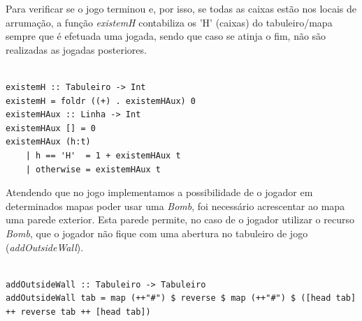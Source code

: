 \documentclass[12pt,a4paper]{report}
\begin{document}
\hfill

\hfill

Para verificar se o jogo terminou e, por isso, se todas as caixas estão nos locais de arrumação, a função \emph{existemH} contabiliza os 'H' (caixas) do tabuleiro/mapa sempre que é efetuada uma jogada, sendo que caso se atinja o fim, não são realizadas as jogadas posteriores.

\hfill

\begin{verbatim}

existemH :: Tabuleiro -> Int
existemH = foldr ((+) . existemHAux) 0
existemHAux :: Linha -> Int
existemHAux [] = 0
existemHAux (h:t)
    | h == 'H'  = 1 + existemHAux t
    | otherwise = existemHAux t

\end{verbatim}

\hfill

\hfill

Atendendo que no jogo implementamos a possibilidade de o jogador em determinados mapas poder usar uma \emph{Bomb}, foi necessário acrescentar ao mapa uma parede exterior. Esta parede permite, no caso de o jogador utilizar o recurso \emph{Bomb}, que o jogador não fique com uma abertura no tabuleiro de jogo (\emph{addOutsideWall}).\\


\begin{verbatim}

addOutsideWall :: Tabuleiro -> Tabuleiro
addOutsideWall tab = map (++"#") $ reverse $ map (++"#") $ ([head tab] 
++ reverse tab ++ [head tab])

\end{verbatim}
\end{document}
